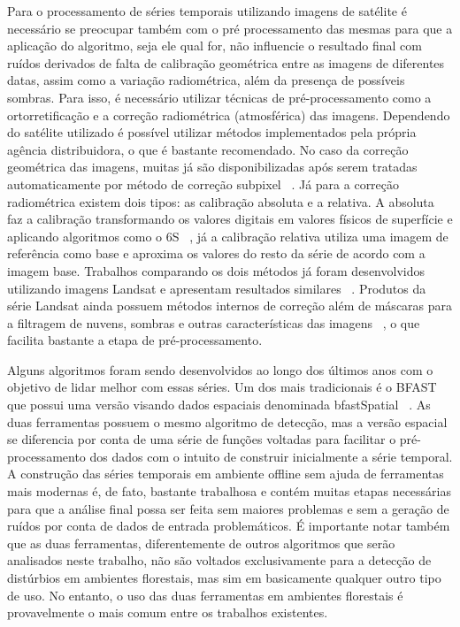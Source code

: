 \documentclass[twocolumn]{article}
\begin{document}
Para o processamento de séries temporais utilizando imagens de satélite é necessário se preocupar também com o pré processamento das mesmas para que a aplicação do algoritmo, seja ele qual for, não influencie o resultado final com ruídos derivados de falta de calibração geométrica entre as imagens de diferentes datas, assim como a variação radiométrica, além da presença de possíveis sombras. Para isso, é necessário utilizar técnicas de pré-processamento como a ortorretificação e a correção radiométrica (atmosférica) das imagens. Dependendo do satélite utilizado é possível utilizar métodos implementados pela própria agência distribuidora, o que é bastante recomendado. No caso da correção geométrica das imagens, muitas já são disponibilizadas após serem tratadas automaticamente por método de correção subpixel ~\cite{Gutjahr2014}. Já para a correção radiométrica existem dois tipos: as calibração absoluta e a relativa. A absoluta faz a calibração transformando os valores digitais em valores físicos de superfície e aplicando algoritmos como o 6S ~\cite{Sagan2004}, já a calibração relativa utiliza uma imagem de referência como base e aproxima os valores do resto da série de acordo com a imagem base. Trabalhos comparando os dois métodos já foram desenvolvidos utilizando imagens Landsat e apresentam resultados similares ~\cite{Chen2010}. Produtos da série Landsat ainda possuem métodos internos de correção além de máscaras para a filtragem de nuvens, sombras e outras características das imagens ~\cite{ZHU2015269, ZHU201283, Huang2010}, o que facilita bastante a etapa de pré-processamento.
\par
Alguns algoritmos foram sendo desenvolvidos ao longo dos últimos anos com o objetivo de lidar melhor com essas séries. Um dos mais tradicionais é o BFAST \sloppy  ~\cite{VERBESSELT2010106, VERBESSELT20102970, VERBESSELT201298} que possui uma versão visando dados espaciais denominada bfastSpatial ~\cite{bfastSpatial}. As duas ferramentas possuem o mesmo algoritmo de detecção, mas a versão espacial se diferencia por conta de uma série de funções voltadas para facilitar o pré-processamento dos dados com o intuito de construir inicialmente a série temporal. A construção das séries temporais em ambiente offline sem ajuda de ferramentas mais modernas é, de fato, bastante trabalhosa e contém muitas etapas necessárias para que a análise final possa ser feita sem maiores problemas e sem a geração de ruídos por conta de dados de entrada problemáticos. É importante notar também que as duas ferramentas, diferentemente de outros algoritmos que serão analisados neste trabalho, não são voltados exclusivamente para a detecção de distúrbios em ambientes florestais,  mas sim em basicamente qualquer outro tipo de uso. No entanto, o uso das duas ferramentas em ambientes florestais é provavelmente o mais comum entre os trabalhos existentes. 
\end{document}
